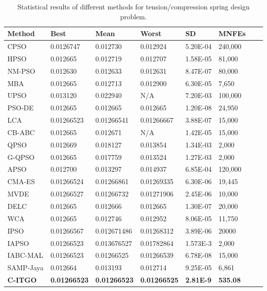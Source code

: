 
\begin{table*}[h]
    \tiny
\begin{center}

\begin{tabular}{ P{2.0cm} P{2.0cm} P{2.0cm} P{2.0cm} P{2.0cm} P{2.0cm} P{2.0cm} P{2.0cm}  }
\hline
\textbf{Method} & \textbf{Best} & \textbf{Mean} & \textbf{Worst} & \textbf{SD} & \textbf{MNFEs} \\
\hline


CPSO & 0.0126747 & 0.012730 & 0.012924 & 5.20E-04 & 240,000 \\
HPSO & 0.012665 & 0.012719 & 0.012707 & 1.58E-05 & 81,000 \\
NM-PSO & 0.012630 & 0.012633 & 0.012631 & 8.47E-07 & 80,000 \\
MBA & 0.012665 & 0.012713 & 0.012900 & 6.30E-05 & 7,650 \\
UPSO & 0.013120 & 0.022940 & N/A & 7.20E-03 & 100,000 \\
PSO-DE & 0.012665 & 0.012665 & 0.012665 & 1.20E-08 & 24,950 \\
LCA & 0.01266523 & 0.01266541 & 0.01266667 & 3.88E-07 & 15,000 \\
CB-ABC & 0.012665 & 0.012671 & N/A & 1.42E-05 & 15,000 \\
QPSO & 0.012669 & 0.018127 & 0.013854 & 1.34E-03 & 2,000 \\
G-QPSO & 0.012665 & 0.017759 & 0.013524 & 1.27E-03 & 2,000 \\
APSO & 0.012700 & 0.013297 & 0.014937 & 6.85E-04 & 120,000 \\
CMA-ES & 0.01266524 & 0.01266861 & 0.01269335 & 6.30E-06 & 19,445 \\
MVDE & 0.01266527 & 0.01266732 & 0.01271906 & 2.45E-06 & 10,000 \\
DELC & 0.012665 & 0.012666 & 0.012665 & 1.30E-07 & 20,000 \\
WCA & 0.012665 & 0.012746 & 0.012952 & 8.06E-05 & 11,750 \\
IPSO & 0.01266567 & 0.012671486 & 0.01268312 & 3.89E-06 & 20000 \\
IAPSO & 0.01266523 & 0.013676527 & 0.01782864 & 1.573E-3 & 2,000 \\
IABC-MAL & 0.01266523 & 0.01266525 & 0.01266539 & 6.78E-08 & 15,000 \\
SAMP-Jaya & 0.012664 & 0.013193 & 0.012714 & 9.25E-05 & 6,861 \\
\textbf{C-ITGO} & \bf{0.01266523} & \bf{0.01266523} & \bf{0.01266525} & \bf{2.81E-9} & \bf{535.08} \\

\hline
\end{tabular}
\end{center}
\vspace*{-6mm}
\caption{Statistical results of different methods for tension/compression spring design problem. \\[1em]}
\label{tab:TC}
\end{table*}

